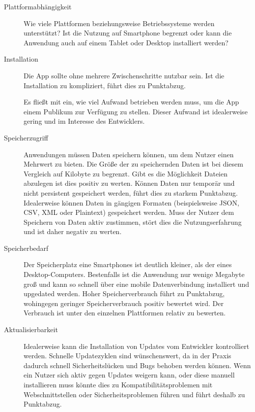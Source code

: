 \begin{description}
	\item [Plattformabhängigkeit]
	      Wie viele Plattformen beziehungsweise Betriebssysteme werden unterstützt?
	      Ist die Nutzung auf Smartphone begrenzt oder kann die Anwendung auch auf einem Tablet oder Desktop installiert werden?

	\item [Installation]
	      Die App sollte ohne mehrere Zwischenschritte nutzbar sein. Ist die Installation zu kompliziert, führt dies zu Punktabzug.

	      Es fließt mit ein, wie viel Aufwand betrieben werden muss, um die App einem Publikum zur Verfügung zu stellen. Dieser Aufwand ist idealerweise gering und im Interesse des Entwicklers.

	\item [Speicherzugriff]
	      Anwendungen müssen Daten speichern können, um dem Nutzer einen Mehrwert zu bieten. Die Größe der zu speichernden Daten ist bei diesem Vergleich auf Kilobyte zu begrenzt. Gibt es die Möglichkeit Dateien abzulegen ist dies positiv zu werten.
	      Können Daten nur temporär und nicht persistent gespeichert werden, führt dies zu starkem Punktabzug. Idealerweise können Daten in gängigen Formaten (beispielsweise JSON, CSV, XML oder Plaintext) gespeichert werden. Muss der Nutzer dem Speichern von Daten aktiv zustimmen, stört dies die Nutzungserfahrung und ist daher negativ zu werten.

	\item [Speicherbedarf]
	      Der Speicherplatz eine Smartphones ist deutlich kleiner, als der eines Desktop-Computers. Bestenfalls ist die Anwendung nur wenige Megabyte groß und kann so schnell über eine mobile Datenverbindung installiert und upgedated werden.
	      Hoher Speicherverbrauch führt zu Punktabzug, wohingegen geringer Speicherverbrauch positiv bewertet wird. Der Verbrauch ist unter den einzelnen Plattformen relativ zu bewerten.

	\item [Aktualisierbarkeit]
	      Idealerweise kann die Installation von Updates vom Entwickler kontrolliert werden. Schnelle Updatezyklen sind wünschenswert, da in der Praxis dadurch schnell Sicherheitslücken und Bugs behoben werden können. Wenn ein Nutzer sich aktiv gegen Updates weigern kann, oder diese manuell installieren muss könnte dies zu Kompatibilitätsproblemen mit Webschnittstellen oder Sicherheitsproblemen führen und führt deshalb zu Punktabzug.


\end{description}
